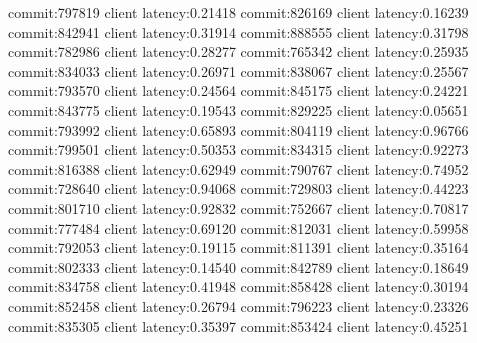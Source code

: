 commit:797819 client latency:0.21418
commit:826169 client latency:0.16239
commit:842941 client latency:0.31914
commit:888555 client latency:0.31798
commit:782986 client latency:0.28277
commit:765342 client latency:0.25935
commit:834033 client latency:0.26971
commit:838067 client latency:0.25567
commit:793570 client latency:0.24564
commit:845175 client latency:0.24221
commit:843775 client latency:0.19543
commit:829225 client latency:0.05651
commit:793992 client latency:0.65893
commit:804119 client latency:0.96766
commit:799501 client latency:0.50353
commit:834315 client latency:0.92273
commit:816388 client latency:0.62949
commit:790767 client latency:0.74952
commit:728640 client latency:0.94068
commit:729803 client latency:0.44223
commit:801710 client latency:0.92832
commit:752667 client latency:0.70817
commit:777484 client latency:0.69120
commit:812031 client latency:0.59958
commit:792053 client latency:0.19115
commit:811391 client latency:0.35164
commit:802333 client latency:0.14540
commit:842789 client latency:0.18649
commit:834758 client latency:0.41948
commit:858428 client latency:0.30194
commit:852458 client latency:0.26794
commit:796223 client latency:0.23326
commit:835305 client latency:0.35397
commit:853424 client latency:0.45251